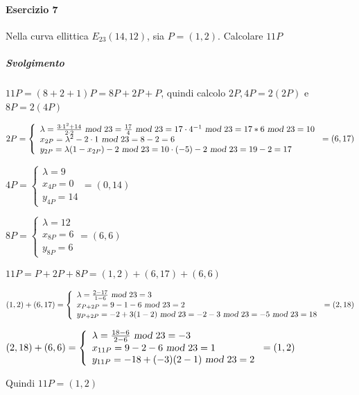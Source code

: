 \documentclass[10pt]{book}
\begin{document}
\paragraph{Esercizio 7} Nella curva ellittica $E_{23}(14,12)$, sia $P=(1,2)$. Calcolare $11P$
\subparagraph{Svolgimento} $11P = (8+2+1)P = 8P + 2P + P$, quindi calcolo $2P, 4P = 2(2P)$ e $8P = 2(4P)$
\begin{list}{}{}
	\item $2P = \left\{\begin{array}{l}
	\lambda = \frac{3\cdot1^2+14}{2\cdot2}\textsl{ mod }23 = \frac{17}{4}\textsl{ mod }23 = 17\cdot 4^{-1}\textsl{ mod }23 = 17*6\textsl{ mod }23 = 10\\
	x_{2P} = \lambda^2 - 2\cdot1\textsl{ mod }23 = 8 - 2 = 6\\
	y_{2P} = \lambda(1-x_{2P}) - 2\textsl{ mod }23 = 10\cdot(-5) - 2\textsl{ mod }23 = 19-2 = 17
	\end{array}\right. = (6,17)$
	\item $4P = \left\{\begin{array}{l}
	\lambda = 9\\
	x_{4P} = 0\\
	y_{4P} = 14
	\end{array}\right. = (0,14)$
	\item $8P = \left\{\begin{array}{l}
	\lambda = 12\\
	x_{8P} = 6\\
	y_{8P} = 6
	\end{array}\right. = (6,6)$
	\item $11P = P + 2P + 8P = (1,2)+(6,17)+(6,6)$
	\begin{list}{}{}
		\item $(1,2)+(6,17) = \left\{\begin{array}{l}
			\lambda = \frac{2-17}{1-6}\textsl{ mod }23 = 3\\
			x_{P + 2P} = 9 - 1 - 6\textsl{ mod }23 = 2\\
			y_{P + 2P} = -2 + 3(1-2)\textsl{ mod }23 = -2 -3\textsl{ mod }23 = -5\textsl{ mod }23 = 18
		\end{array}\right. = (2,18)$
		\item $(2,18)+(6,6) = \left\{\begin{array}{l}
			\lambda = \frac{18-6}{2-6}\textsl{ mod }23 = -3\\
			x_{11P} = 9 - 2 - 6\textsl{ mod }23 = 1\\
			y_{11P} = -18 + (-3)(2-1)\textsl{ mod }23 = 2
		\end{array}\right. = (1,2)$
	\end{list}
\end{list}
Quindi $11P = (1,2)$
\end{document}
